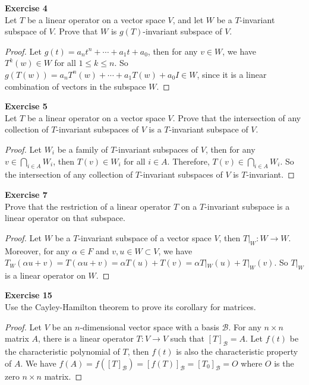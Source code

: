 \documentclass[12pt, a4paper]{article}
\theoremstyle{plain}
\newcommand{\B}{\mathscr{B}}
\newenvironment{exercise}[2][Exercise]
    { \begin{mdframed}[backgroundcolor=gray!20] \textbf{#1 #2} \\}
    {  \end{mdframed}}
\begin{document}
\begin{exercise}{4}
Let $T$ be a linear operator on a vector space $V$, and let $W$ be a $T$-invariant subspace of $V$. Prove that $W$ is $g(T)$-invariant subspace of $V$. 
\end{exercise}
	\begin{proof}
	Let $g(t)=a_nt^n+\cdots +a_1t+a_0$, then for any $v\in W$, we have $T^k(w)\in W$ for all $1\leq k\leq n$. So $g(T(w))=a_nT^n(w)+\cdots +a_1T(w)+a_0I\in W$, since it is a linear combination of vectors in the subspace $W$.
	\end{proof}

\begin{exercise}{5}
Let $T$ be a linear operator on a vector space $V$. Prove that the intersection of any collection of $T$-invariant subspaces of $V$ is a $T$-invariant subspace of $V$.
\end{exercise}
	\begin{proof}
	Let $W_i$ be a family of $T$-invariant subspaces of $V$, then for any $v\in \bigcap_{i\in A}W_i$, then $T(v)\in W_i$ for all $i\in A$. Therefore, $T(v)\in \bigcap_{i\in A}W_i$. So the intersection of any collection of $T$-invariant subspaces of $V$ is $T$-invariant.
	\end{proof}

\begin{exercise}{7}
Prove that the restriction of a linear operator $T$ on a $T$-invariant subspace is a linear operator on that subspace.
\end{exercise}
	\begin{proof}
	Let $W$ be a $T$-invariant subspace of a vector space $V$, then $T|_W:W\rightarrow W$. Moreover, for any $\alpha\in F$ and $v,u\in W\subset V$, we have $T_W(\alpha u+v)=T(\alpha u+v)=\alpha T(u)+T(v)=\alpha T|_W(u)+T|_W(v)$. So $T|_W$ is a linear operator on $W$.
	\end{proof}

\begin{exercise}{15}
Use the Cayley-Hamilton theorem to prove its corollary for matrices.
\end{exercise}
	\begin{proof}
	Let $V$ be an $n$-dimensional vector space with a basis $\B$. For any $n\times n$ matrix $A$, there is a linear operator $T:V\rightarrow V$ such that $[T]_\B=A$. Let $f(t)$ be the characteristic polynomial of $T$, then $f(t)$ is also the characteristic property of $A$. We have $f(A)=f([T]_\B)=[f(T)]_\B=[T_0]_\B=O$ where $O$ is the zero $n\times n$ matrix.
	\end{proof}
\end{document}
